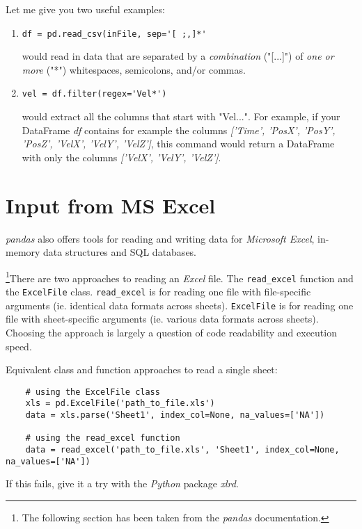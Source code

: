 Let me give you two useful examples:

\begin{enumerate}
  \item \lstinline{df = pd.read_csv(inFile, sep='[ ;,]*'}

  would read in data that are separated by a \emph{combination} ("[...]") of \emph{one or more} ("*") whitespaces, semicolons, and/or commas.

  \item \lstinline{vel = df.filter(regex='Vel*')}

  would extract all the columns that start with "Vel...". For example, if your DataFrame \emph{df} contains for example the columns \emph{['Time', 'PosX', 'PosY', 'PosZ', 'VelX', 'VelY', 'VelZ']}, this command would return a DataFrame with only the columns \emph{['VelX', 'VelY', 'VelZ']}.
\end{enumerate}

\section{Input from MS Excel}

\emph{pandas} also offers tools for reading and writing data for \emph{Microsoft Excel}, in-memory data structures and SQL databases.

\footnote{The following section has been taken from the \emph{pandas} documentation.}There are two approaches to reading an \emph{Excel} file. The \lstinline{read_excel} function and the \lstinline{ExcelFile} class. \lstinline{read_excel} is for reading one file with file-specific arguments (ie. identical data formats across sheets). \lstinline{ExcelFile} is for reading one file with sheet-specific arguments (ie. various data formats across sheets). Choosing the approach is largely a question of code readability and execution speed.

Equivalent class and function approaches to read a single sheet:

\begin{lstlisting}
    # using the ExcelFile class
    xls = pd.ExcelFile('path_to_file.xls')
    data = xls.parse('Sheet1', index_col=None, na_values=['NA'])

    # using the read_excel function
    data = read_excel('path_to_file.xls', 'Sheet1', index_col=None, na_values=['NA'])
\end{lstlisting}

If this fails, give it a try with the \emph{Python} package \emph{xlrd}.

